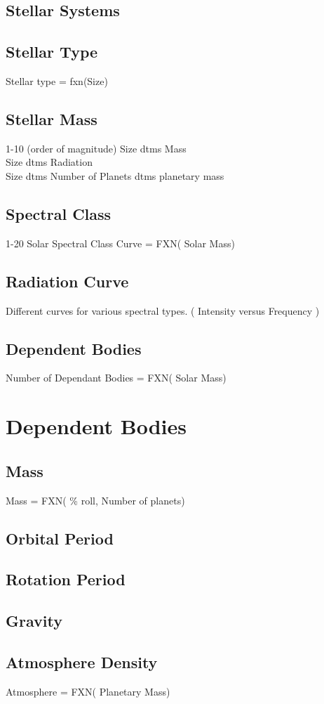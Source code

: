 \section{Stellar Systems}
\section{Stellar Type}
Stellar type = fxn(Size)
\section{Stellar Mass}
1-10 (order of magnitude)
Size dtms Mass \\
Size dtms Radiation \\
Size dtms Number of Planets dtms planetary mass \\
\section{Spectral Class}
1-20
Solar Spectral Class Curve = FXN( Solar Mass)
\section{Radiation Curve}
Different curves for various spectral types. ( Intensity versus 
Frequency )
\section{Dependent Bodies}
Number of Dependant Bodies = FXN( Solar Mass)

\chapter{Dependent Bodies}
\section{Mass}
Mass = FXN( \% roll, Number of planets) 
\section{Orbital Period}
\section{Rotation Period}
\section{Gravity}
\section{Atmosphere Density}
Atmosphere = FXN( Planetary Mass)
